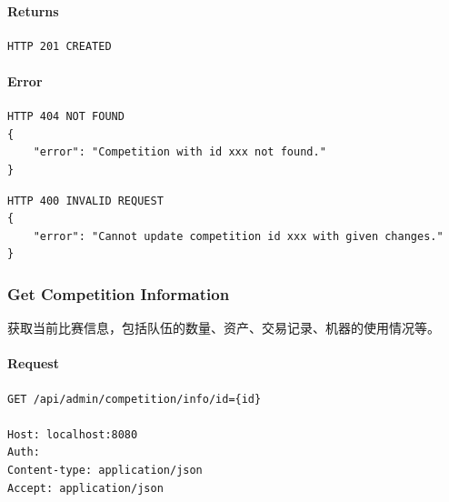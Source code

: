 \documentclass{article}
\begin{document}
\paragraph*{Returns}
\begin{lstlisting}
HTTP 201 CREATED
\end{lstlisting}

\paragraph*{Error}
\begin{lstlisting}
HTTP 404 NOT FOUND
{
    "error": "Competition with id xxx not found."
}
\end{lstlisting}

\begin{lstlisting}
HTTP 400 INVALID REQUEST
{
    "error": "Cannot update competition id xxx with given changes."
}
\end{lstlisting}

\subsubsection{Get Competition Information}
获取当前比赛信息，包括队伍的数量、资产、交易记录、机器的使用情况等。

\paragraph*{Request}
\begin{lstlisting}
GET /api/admin/competition/info/id={id}

Host: localhost:8080
Auth:
Content-type: application/json
Accept: application/json
\end{lstlisting}
\end{document}
